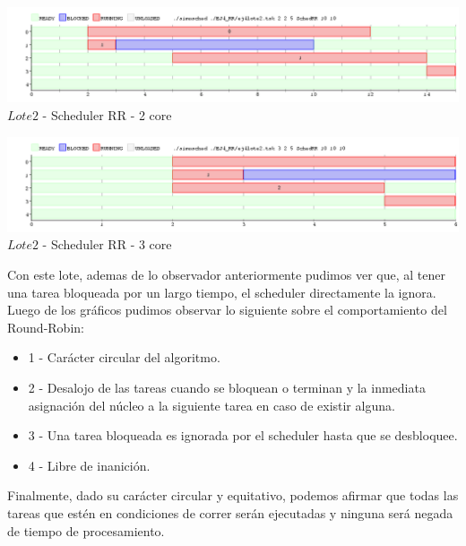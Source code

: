  \begin{center}
    	\includegraphics[width=450pt]{./EJ4_RR/ejercicio4-2lote2nucleo.png}
	{$Lote 2$ - Scheduler RR - 2 core}	
 \end{center}
 
 \begin{center}
    	\includegraphics[width=450pt]{./EJ4_RR/ejercicio4-2lote3nucleo.png}
	{$Lote 2$ - Scheduler RR - 3 core}	
 \end{center}

 \indent Con este lote, ademas de lo observador anteriormente pudimos ver que, al tener una tarea bloqueada
 por un largo tiempo, el scheduler directamente la ignora.\\
 
\indent Luego de los gráficos pudimos observar lo siguiente sobre el comportamiento  del Round-Robin:\\
\begin{itemize}
\item 1 - Carácter circular del algoritmo.
\item 2 - Desalojo de las tareas cuando se bloquean o terminan y la inmediata asignación del núcleo a la siguiente tarea en caso de existir alguna.
\item 3 - Una tarea bloqueada es ignorada por el scheduler hasta que se desbloquee.
\item 4 - Libre de inanición.
\end{itemize}

\indent Finalmente, dado su carácter circular y equitativo, podemos afirmar que todas las tareas que 
estén en condiciones de correr serán ejecutadas y ninguna será negada de tiempo de procesamiento.\\